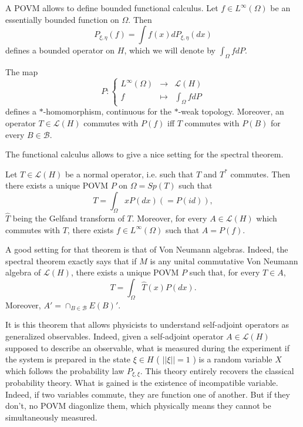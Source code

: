 A POVM allows to define bounded functional calculus. Let $f\in L^\infty(\Omega)$ be an essentially bounded function on $\Omega$. Then 
\[P_{\xi,\eta}(f) = \int f(x) dP_{\xi,\eta}(dx)\]
defines a bounded operator on $H$, which we will denote by $\int_\Omega f dP$.

\begin{prop}
The map 
\[P : \left\{\begin{array}{rcl}
L^\infty(\Omega) & \rightarrow & \mathcal L(H) \\
f & \mapsto & \int_\Omega f dP
\end{array}\right.\]
defines a $*$-homomorphism, continuous for the $*$-weak topology. Moreover, an operator $T\in\mathcal L(H)$ commutes with $P(f)$ iff $T$ commutes with $P(B)$ for every $B\in\mathcal B$.
\end{prop}

The functional calculus allows to give a nice setting for the spectral theorem.

\begin{thm} Let $T\in \mathcal L(H)$ be a normal operator, i.e. such that $T$ and $T^*$ commutes. Then there exists a unique POVM $P$ on $\Omega = Sp(T)$ such that 
\[T = \int_\Omega x P(dx) (=P(id)),\]
$\hat T$ being the Gelfand transform of $T$. Moreover, for every $A\in \mathcal L(H)$ which commutes with $T$, there exists $f\in L^\infty (\Omega)$ such that $A= P(f)$.
\end{thm}

\begin{rk} A good setting for that theorem is that of Von Neumann algebras. Indeed, the spectral theorem exactly says that if $M$ is any unital commutative Von Neumann algebra of $\mathcal L(H)$, there exists a unique POVM $P$ such that, for every $T\in A$,
\[T = \int_\Omega \hat T(x) P(dx).\]
Moreover,  $A' = \cap_{B\in\mathcal B} E(B)'$.
\end{rk}

It is this theorem that allows physicists to understand self-adjoint operators as generalized observables. Indeed, given a self-adjoint operator $A\in\mathcal L(H)$ supposed to describe an observable, what is measured during the experiment if the system is prepared in the state $\xi\in H$ ( $||\xi||= 1$ ) is a random variable $X$ which follows the probability law $P_{\xi,\xi}$. This theory entirely recovers the classical probability theory. What is gained is the existence of incompatible variable. Indeed, if two variables commute, they are function one of another. But if they don't, no POVM diagonlize them, which physically means they cannot be simultaneously measured.  

